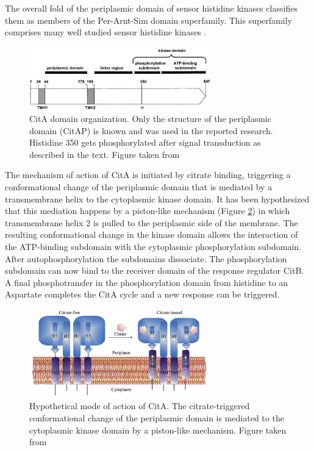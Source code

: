 \documentclass[english, a4paper, 12pt, titlepage, draft]{article}
\begin{document}
The overall fold of the periplasmic domain of sensor histidine kinases classifies them as members of the Per-Arnt-Sim domain superfamily.
This superfamily comprises many well studied sensor histidine kinases \cite{PAS}.


\begin{figure}
    \centering
    \includegraphics[width=0.7\textwidth]{figures/CitA_organization.png}
    \caption{CitA domain organization. Only the structure of the periplasmic domain (CitAP) is known and was used in the reported research. Histidine 350 gets phosphorylated after signal transduction as described in the text. Figure taken from \cite{CitA_original}}
    \label{fig:CitA_organization}
\end{figure}   


The mechanism of action of CitA \cite{CitA_original} is initiated by citrate binding, triggering a conformational change of the periplasmic domain that is mediated by a transmembrane helix to the cytoplasmic kinase domain.
It has been hypothesized that this mediation happens by a piston-like mechanism (Figure \ref{fig:CitA_mechanism}) in which transmembrane helix 2 is pulled to the periplasmic side of the membrane.
The resulting conformational change in the kinase domain allows the interaction of the ATP-binding subdomain with the cytoplasmic phosphorylation subdomain.
After autophosphorylation the subdomains dissociate.
The phosphorylation subdomain can now bind to the receiver domain of the response regulator CitB.
A final phosphotransfer in the phosphorylation domain from histidine to an Aspartate completes the CitA cycle and a new response can be triggered.


\begin{figure}
    \centering
    \includegraphics[width=0.7\textwidth]{figures/CitA_mechanism.png}
    \caption{Hypothetical mode of action of CitA. The citrate-triggered conformational change of the periplasmic domain is mediated to the cytoplasmic kinase domain by a piston-like mechanism. Figure taken from \cite{CitA_2J80}}
    \label{fig:CitA_mechanism}
\end{figure}    
\end{document}
